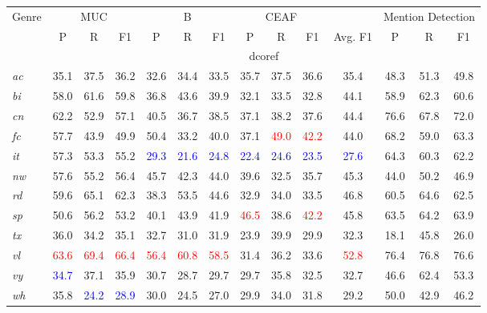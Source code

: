 \documentclass[11pt,a4paper]{article}
\begin{document}
\begin{table*}[t!hb]
    \centering\small
    \begin{tabular}{l|cccccccccc|ccc}


    \multirow{2}{*}{Genre} & \multicolumn{3}{c}{MUC} & \multicolumn{3}{c}{B} & \multicolumn{3}{c}{CEAF} && \multicolumn{3}{c}{Mention Detection} \\
     & P & R & F1 & P & R & F1 & P & R & F1 & Avg. F1 & P & R & F1\\
     \hline\hline
    
& \multicolumn{13}{c}{dcoref}\\\hline
    \textit{ac} & 35.1 & 37.5 & 36.2 & 32.6 & 34.4 & 33.5 & 35.7 & 37.5 & 36.6 & 35.4 & 48.3 & 51.3 & 49.8 \\
    \textit{bi} & 58.0 & 61.6 & 59.8 & 36.8 & 43.6 & 39.9 & 32.1 & 33.5 & 32.8 & 44.1 & 58.9 & 62.3 & 60.6 \\
    \textit{cn} & 62.2 & 52.9 & 57.1 & 40.5 & 36.7 & 38.5 & 37.1 & 38.2 & 37.6 & 44.4 & 76.6 & 67.8 & 72.0\\
    \textit{fc} & 57.7 & 43.9 & 49.9 & 50.4 & 33.2 & 40.0 & 37.1 & \textcolor{red}{49.0} & \textcolor{red}{42.2} & 44.0 & 68.2 & 59.0 & 63.3\\
    \textit{it} & 57.3 & 53.3 & 55.2 & \textcolor{blue}{29.3} & \textcolor{blue}{21.6} & \textcolor{blue}{24.8} & \textcolor{blue}{22.4} & \textcolor{blue}{24.6} & \textcolor{blue}{23.5} & \textcolor{blue}{27.6} & 64.3 & 60.3 & 62.2\\
    \textit{nw} & 57.6 & 55.2 & 56.4 & 45.7 & 42.3 & 44.0 & 39.6 & 32.5 & 35.7 & 45.3 & 44.0 & 50.2 & 46.9 \\
    \textit{rd} & 59.6 & 65.1 & 62.3 & 38.3 & 53.5 & 44.6 & 32.9 & 34.0 & 33.5 & 46.8 & 60.5 & 64.6 & 62.5 \\
    \textit{sp} & 50.6 & 56.2 & 53.2 & 40.1 & 43.9 & 41.9 & \textcolor{red}{46.5} & 38.6 & \textcolor{red}{42.2} & 45.8 & 63.5 & 64.2 & 63.9\\
    \textit{tx} & 36.0 & 34.2 & 35.1 & 32.7 & 31.0 & 31.9 & 23.9 & 39.9 & 29.9 & 32.3 & 18.1 & 45.8 & 26.0 \\
    \textit{vl} & \textcolor{red}{63.6} & \textcolor{red}{69.4} & \textcolor{red}{66.4} & \textcolor{red}{56.4} & \textcolor{red}{60.8} & \textcolor{red}{58.5} & 31.4 & 36.2 & 33.6 & \textcolor{red}{52.8} & 76.4 & 76.8 & 76.6\\
    \textit{vy} & \textcolor{blue}{34.7} & 37.1 & 35.9 & 30.7 & 28.7 & 29.7 & 29.7 & 35.8 & 32.5 & 32.7 & 46.6 & 62.4 & 53.3\\
    \textit{wh} & 35.8 & \textcolor{blue}{24.2} & \textcolor{blue}{28.9} & 30.0 & 24.5 & 27.0 & 29.9 & 34.0 & 31.8 & 29.2 & 50.0 & 42.9 & 46.2\\


\end{tabular}
\end{table*}
\end{document}

